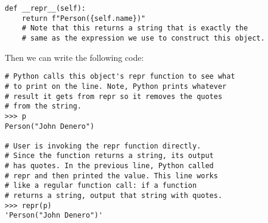 \begin{lstlisting}
def __repr__(self):
    return f"Person({self.name})" 
    # Note that this returns a string that is exactly the
    # same as the expression we use to construct this object.
\end{lstlisting}

Then we can write the following code:

\begin{lstlisting}
# Python calls this object's repr function to see what
# to print on the line. Note, Python prints whatever 
# result it gets from repr so it removes the quotes
# from the string.
>>> p 
Person("John Denero")

# User is invoking the repr function directly.
# Since the function returns a string, its output
# has quotes. In the previous line, Python called
# repr and then printed the value. This line works 
# like a regular function call: if a function 
# returns a string, output that string with quotes.
>>> repr(p) 
'Person("John Denero")'
\end{lstlisting}


